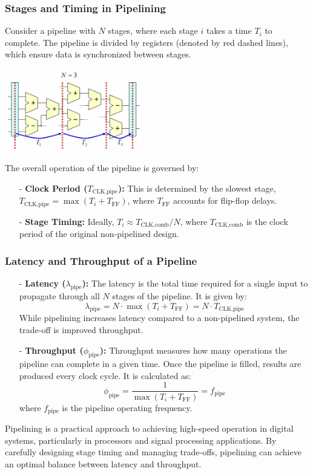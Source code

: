 \subsubsection*{Stages and Timing in Pipelining}
Consider a pipeline with $N$ stages, where each stage $i$ takes a time $T_i$ to complete. The pipeline is divided by registers (denoted by red dashed lines), which ensure data is synchronized between stages.
\begin{center}
    \includegraphics[width=0.45\textwidth]{chapters/chapter4b/images/practical.png}
\end{center}
The overall operation of the pipeline is governed by:
\begin{itemize}
    \item[-] \textbf{Clock Period ($T_\text{CLK,pipe}$):} This is determined by the slowest stage, $T_\text{CLK,pipe} = \max(T_i + T_\text{FF})$, where $T_\text{FF}$ accounts for flip-flop delays.
    \item[-] \textbf{Stage Timing:} Ideally, $T_i \approx T_\text{CLK,comb}/N$, where $T_\text{CLK,comb}$ is the clock period of the original non-pipelined design.
\end{itemize}

\subsubsection*{Latency and Throughput of a Pipeline}

\begin{itemize}
    \item[-] \textbf{Latency ($\lambda_\text{pipe}$):} The latency is the total time required for a single input to propagate through all $N$ stages of the pipeline. It is given by:
    \[
    \lambda_\text{pipe} = N \cdot \max(T_i + T_\text{FF}) = N \cdot T_\text{CLK,pipe}
    \]
    While pipelining increases latency compared to a non-pipelined system, the trade-off is improved throughput.

    \item[-] \textbf{Throughput ($\phi_\text{pipe}$):} Throughput measures how many operations the pipeline can complete in a given time. Once the pipeline is filled, results are produced every clock cycle. It is calculated as:
    \[
    \phi_\text{pipe} = \frac{1}{\max(T_i + T_\text{FF})} = f_\text{pipe}
    \]
    where $f_\text{pipe}$ is the pipeline operating frequency.
\end{itemize}

Pipelining is a practical approach to achieving high-speed operation in digital systems, particularly in processors and signal processing applications. By carefully designing stage timing and managing trade-offs, pipelining can achieve an optimal balance between latency and throughput.
